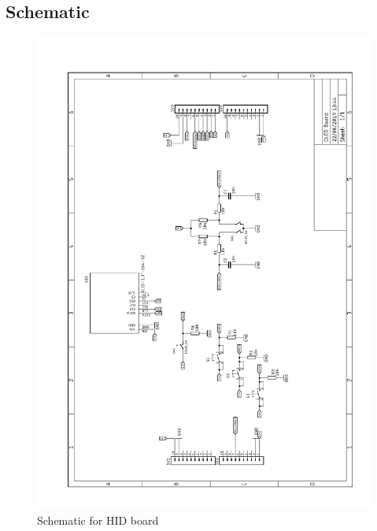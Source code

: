 \documentclass{article}
\begin{document}
 \subsection{Schematic}
    \begin{figure}[H]
  	\centering
  	\includegraphics[width=1\linewidth]{OLED-Board.pdf}
  	\caption{Schematic for HID board}
 	 \label{fig:schematic4}
\end{figure}
\end{document}
